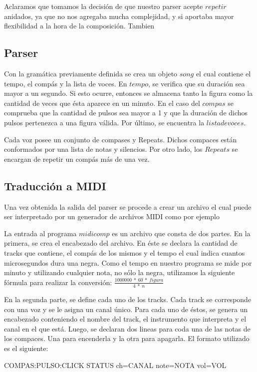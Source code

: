 \documentclass[a4paper, 10pt, twoside]{article}
\begin{document}
Aclaramos que tomamos la decisión de que nuestro parser acepte $repetir$ anidados, ya que no nos agregaba mucha complejidad, y si aportaba mayor flexibilidad a la hora de la composición.
Tambien

\subsection{Parser}

Con la gramática previamente definida se crea un objeto $song$ el cual contiene el tempo, el compás y la lista de voces. En $tempo$, se verifica que su duración sea mayor a un segundo. Si esto ocurre, entonces se almacena tanto la figura como la cantidad de veces que ésta aparece en un minuto. En el caso del $compas$ se comprueba que la cantidad de pulsos sea mayor a 1 y que la duración de dichos pulsos pertenezca a una figura válida. Por último, se encuentra la $lista de voces$. 

Cada voz posee un conjunto de compases y Repeats. Dichos compaces están conformados por una lista de notas y silencios. Por otro lado, los $Repeats$ se encargan de repetir un compás más de una vez.

\subsection{Traducción a MIDI}
Una vez obtenida la salida del parser se procede a crear un archivo el cual puede ser interpretado por un generador de archivos MIDI como por ejemplo 

La entrada al programa $midicomp$ es un archivo que consta de dos partes. En la primera, se crea el encabezado del archivo. En éste se declara la cantidad de tracks que contiene, el compás de los mismos y el tempo el cual indica cuantos microsegundos dura una negra. Como el tempo en nuestro programa se mide por minuto y utilizando cualquier nota, no sólo la negra, utilizamos la siguiente fórmula para realizar la conversión:
$\frac{1000000\ *\ 60\ *\ figura}{4\ *\ n}$

En la segunda parte, se define cada uno de los tracks. Cada track se corresponde con una voz y se le asigna un canal único. Para cada uno de éstos, se genera un encabezado conteniendo el nombre del track, el instrumento que interpreta y el canal en el que está. Luego, se declaran dos lineas para coda una de las notas de los compaces. Una para encenderla y la otra para apagarla. El formato utilizado es el siguiente:

\begin{center} 
COMPAS:PULSO:CLICK STATUS ch=CANAL note=NOTA vol=VOL
\end{center}
\end{document}
